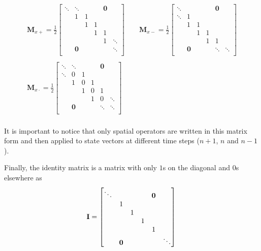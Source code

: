 \begin{gather*}
    \mathbf{M}_{x+} = \frac{1}{2}\begin{bmatrix}
        \ddots &\ddots & & & \mathbf{0}&\\
         & 1 & 1 & & & \\
        & & 1 & 1 & & \\
        & & & 1 & 1 & \\
        & & & & 1 & \ddots\\
        &\mathbf{0} & & & & \ddots \\
    \end{bmatrix}
    \qquad
    \mathbf{M}_{x-} = \frac{1}{2}\begin{bmatrix}
        \ddots & & & & \mathbf{0}&\\
        \ddots & 1 & & & & \\
        & 1 & 1 & & & \\
        & & 1 & 1 & & \\
        & & & 1 & 1 & \\
        &\mathbf{0} & & & \ddots & \ddots \\
    \end{bmatrix}\\
    \\
    \mathbf{M}_{x\cdot} = \frac{1}{2}\begin{bmatrix}
        \ddots &\ddots & & & \mathbf{0}&\\
        \ddots & 0 & 1 & & & \\
        & 1 & 0 & 1 & & \\
        & & 1 & 0 & 1 & \\
        & & & 1 & 0 & \ddots \\
        &\mathbf{0} & & & \ddots & \ddots \\
    \end{bmatrix}\\
\end{gather*}

It is important to notice that only spatial operators are written in this matrix form and then applied to state vectors at different time steps ($n+1$, $n$ and $n-1$). 

Finally, the identity matrix is a matrix with only $1$s on the diagonal and $0$s elsewhere as
\begin{equation}
    \mathbf{I} = \begin{bmatrix}
        \ddots & & & & \mathbf{0}&\\
         & 1 & & & & \\
        & & 1 & & & \\
        & & & 1 & & \\
        & & & & 1 & \\
        &\mathbf{0} & & &  & \ddots \\
    \end{bmatrix}\\
\end{equation}


